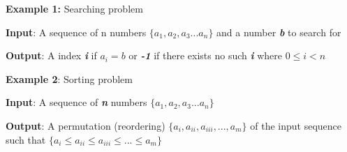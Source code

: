 \documentclass[12pt,a4paper]{book}
\begin{document}
\textbf{Example 1:} Searching problem

\textbf{Input}: A sequence of n numbers $\{a_{1} , a_{2} , a_{3} ... a_{n} \}$ and a number \textit{\textbf{b}} to search for

\textbf{Output}: A index \textbf{\textit{i}} if $a_{i} = b$  or \textbf{\textit{-1}} if there exists no such  \textbf{\textit{i}} where $0 \leq i < n$ 

\textbf{Example 2}: Sorting problem

\textbf{Input}: A sequence of \textbf{\textit{n}} numbers $\{a_{1} , a_{2} , a_{3} ... a_{n} \}$

\textbf{Output}: A permutation (reordering) $\{ a_{i}, a_{ii}, a_{iii}, ..., a_{m} \}$ of the input sequence such that $\{ a_{i} \leq a_{ii} \leq a_{iii} \leq ... \leq a_{m} \}$
\\
\end{document}
